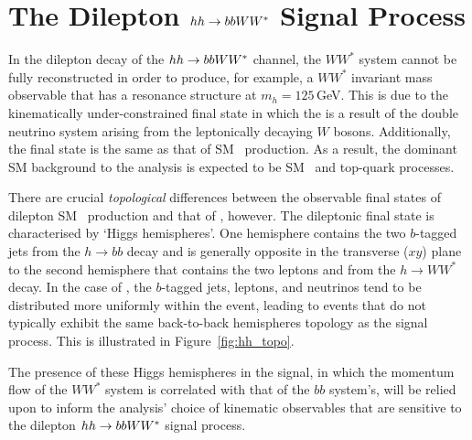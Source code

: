 \section{The Dilepton $hh \rightarrow bbWW^*$ Signal Process}
\label{sec:hh_pheno}

{\color{red}{MENTION SCALAR WW DECAY AND WW SPIN CORRELATION THAT ONLY THE DILEPTON CHANNEL CAN TAKE ADVANTAGE OF}}

In the dilepton decay of the $hh \rightarrow bbWW^*$ channel, the $WW^*$ system
cannot be fully reconstructed in order to produce, for example, a $WW^*$ invariant
mass observable that has a resonance structure at $m_h = 125$\,GeV.
This is due to the
kinematically under-constrained final state in which the \met is a result of the double neutrino system
arising from the leptonically decaying $W$ bosons.
Additionally, the final state is the same as that of SM \ttbar~production.
As a result, the dominant SM background to the analysis is expected to be SM \ttbar~and top-quark processes.

There are crucial \textit{topological} differences between the observable final states of dilepton SM \ttbar~production and
that of \bbww, however.
The dileptonic \bbww final state is characterised by `Higgs hemispheres'.
One hemisphere contains the two $b$-tagged jets from the $h \rightarrow bb$ decay and is generally
opposite in the transverse ($xy$) plane to the second hemisphere that contains the two leptons
and \met from the $h \rightarrow WW^*$ decay.
In the case of \ttbar, the $b$-tagged jets, leptons, and neutrinos tend to be distributed more uniformly
within the event, leading to events that do not typically exhibit the same back-to-back hemispheres
topology as the \bbww signal process.
This is illustrated in Figure~\ref{fig:hh_topo}.

The presence of these Higgs hemispheres in the signal, in which the momentum flow of the $WW^*$ system
is correlated with that of the $bb$ system's, will be relied upon to inform the analysis' choice
of kinematic observables that are sensitive to the dilepton $hh \rightarrow bbWW^*$ signal process.

